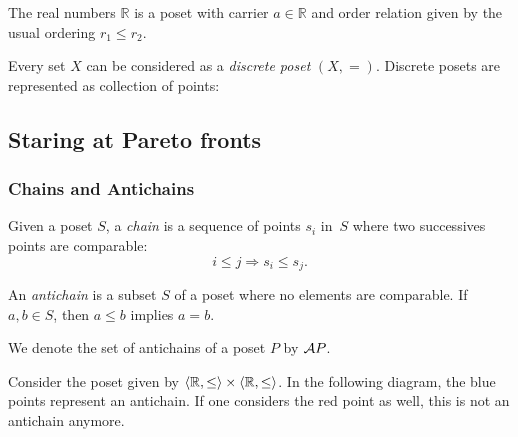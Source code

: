 \begin{example}[Reals]
The real numbers $\mathbb{R}$ is a poset with carrier $a\in \mathbb{R}$ and order relation given by the usual ordering $r_1 \leq r_2$.
\end{example}


\begin{example}
\label{ex:discreteposet}
{Every set $X$ can be considered as a \emph{discrete poset} $(X,=)$. Discrete posets are represented as collection of points:}
\begin{center}
\end{center}
\end{example}


\subsection{Staring at Pareto fronts}

\subsubsection{Chains and Antichains} \label{sec:chains-antichains}


\begin{definition}
\label{def:chain}
Given a poset $S$, a \emph{chain} is a sequence of points ${s_i}$ in~$S$ where two successives points are comparable:
\begin{equation}
    i \leq j \Rightarrow s_i \leq s_j.
\end{equation}
\end{definition}

 
\begin{definition}
\label{def:antichain}
An \emph{antichain} is a subset $S$ of a poset where no elements are comparable. If $a,b \in S$, then $a \leq b$ implies $a=b$.
\end{definition}
We denote the set of antichains of a poset $P$ by $\mathcal{A} P$.

\begin{example}
\label{ex:graphicantichain}
Consider the poset given by $\langle\mathbb{R},\leq\rangle\times \langle\mathbb{R},\leq\rangle$. In the following diagram, the blue points represent an antichain. If one considers the red point as well, this is not an antichain anymore. 
\begin{center}
\end{center}
\end{example}

